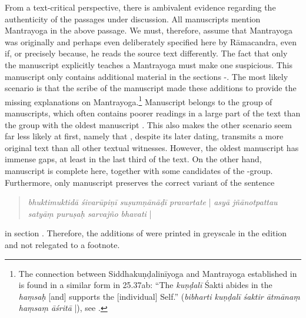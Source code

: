 From a text-critical perspective, there is ambivalent evidence regarding the authenticity of the passages under discussion. All manuscripts mention Mantrayoga in the above passage. We must, therefore, assume that Mantrayoga was originally and perhaps even deliberately specified here by Rāmacandra, even if, or precisely because, he reads the source text differently. The fact that only the manuscript  explicitly teaches a Mantrayoga must make one suspicious. This manuscript only contains additional material in the sections -. The most likely scenario is that the scribe of the manuscript  made these additions to provide the missing explanations on Mantrayoga.\footnote{The connection between Siddhakuṇḍalinīyoga and Mantrayoga established in  is found in a similar form in  25.37ab: ``The \textit{kuṇḍalī} Śakti abides in the \textit{haṃsaḥ} [and] supports the [individual] Self.'' (\textit{bibharti kuṇḍalī śaktir ātmānaṃ haṃsaṃ āśritā} |), see \citeauthor[2011: pp. 218, 228]{saradatilakafull}.} Manuscript  belongs to the \beta group of manuscripts, which often contains poorer readings in a large part of the text than the \alpha group with the oldest manuscript . This also makes the other scenario seem far less likely at first, namely that , despite its later dating, transmits a more original text than all other textual witnesses. However, the oldest manuscript  has immense gaps, at least in the last third of the text. On the other hand, manuscript  is complete here, together with some candidates of the \beta-group. Furthermore, only manuscript  preserves the correct variant of the sentence \begin{quote} \textit{bhuktimuktidā śivarūpiṇī suṣumṇānāḍī pravartate} | \textit{asyā jñānotpattau satyāṃ puruṣaḥ sarvajño bhavati} | \end{quote} in section . Therefore, the additions of  were printed in greyscale in the edition and not relegated to a footnote.


